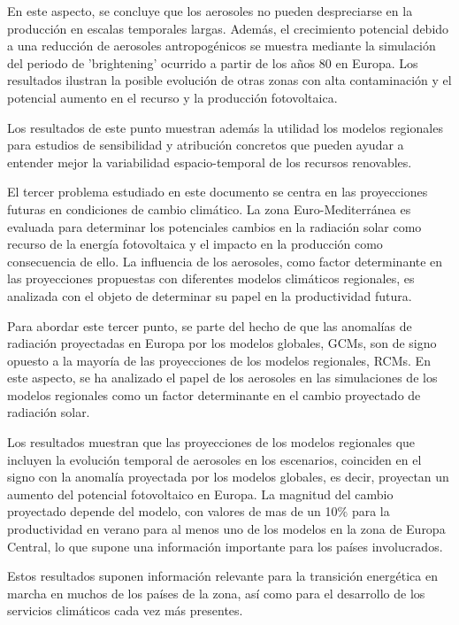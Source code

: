 En este aspecto, se concluye que los aerosoles no pueden despreciarse en la producción en escalas temporales largas. Además, el crecimiento potencial debido a una reducción de aerosoles antropogénicos se muestra mediante la simulación del periodo de 'brightening' ocurrido a partir de los años 80 en Europa. Los resultados ilustran la posible evolución de otras zonas con alta contaminación y el potencial aumento en el recurso y la producción fotovoltaica.

Los resultados de este punto muestran además la utilidad los modelos regionales para estudios de sensibilidad y atribución concretos que pueden ayudar a entender mejor la variabilidad espacio-temporal de los recursos renovables.\\

\starbreak

El tercer problema estudiado en este documento se centra en las proyecciones futuras en condiciones de cambio climático. La zona Euro-Mediterránea es evaluada para determinar los potenciales cambios en la radiación solar como recurso de la energía fotovoltaica y el impacto en la producción como consecuencia de ello. La influencia de los aerosoles, como factor determinante en las proyecciones propuestas con diferentes modelos climáticos regionales, es analizada con el objeto de determinar su papel en la productividad futura.

Para abordar este tercer punto, se parte del hecho de que las anomalías de radiación proyectadas en Europa por los modelos globales, GCMs, son de signo opuesto a la mayoría de las proyecciones de los modelos regionales, RCMs. En este aspecto, se ha analizado el papel de los aerosoles en las simulaciones de los modelos regionales como un factor determinante en el cambio proyectado de radiación solar.

Los resultados muestran que las proyecciones de los modelos regionales que incluyen la evolución temporal de aerosoles en los escenarios, coinciden en el signo con la anomalía proyectada por los modelos globales, es decir, proyectan un aumento del potencial fotovoltaico en Europa. La magnitud del cambio proyectado depende del modelo, con valores de mas de un 10$\%$ para la productividad en verano para al menos uno de los modelos en la zona de Europa Central, lo que supone una informaci\'on importante para los pa\'ises involucrados.

Estos resultados suponen información relevante para la transición energética en marcha en muchos de los países de la zona, así como para el desarrollo de los servicios climáticos cada vez más presentes.

